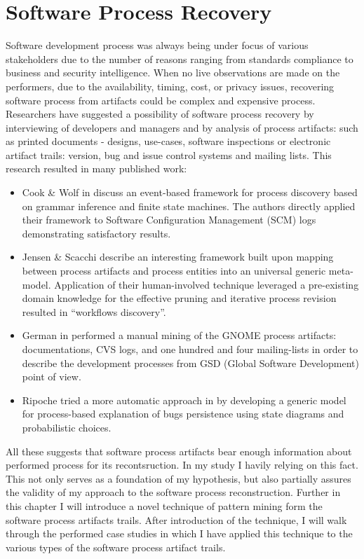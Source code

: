 \chapter{Software Process Recovery}
Software development process was always being under focus of various stakeholders due to the number of reasons ranging from standards compliance to business and security intelligence. When no live observations are made on the performers, due to the availability, timing, cost, or privacy issues, recovering software process from artifacts could be complex and expensive process. Researchers have suggested a possibility of software process recovery by interviewing of developers and managers and by analysis of process artifacts: such as printed documents - designs, use-cases, software inspections or electronic artifact trails: version, bug and issue control systems and mailing lists. This research resulted in many published work: 
\begin{itemize}
\item{Cook \& Wolf in \cite{citeulike:328044} discuss an event-based framework for process discovery based on grammar inference and finite state machines. The authors directly applied their framework to Software Configuration Management (SCM) logs demonstrating satisfactory results.}
\item{Jensen \& Scacchi \cite{citeulike:5043664} describe an interesting framework built upon mapping between process artifacts and process entities into an universal generic meta-model. Application of their human-involved technique leveraged a pre-existing domain knowledge for the effective pruning and iterative process revision resulted in ``workflows discovery''.}
\item{German in \cite{citeulike:421438} performed a manual mining of the GNOME process artifacts: documentations, CVS logs, and one hundred and four mailing-lists in order to describe the development processes from GSD (Global Software Development) point of view.
}
\item{Ripoche tried a more automatic approach in \cite{citeulike:9112798} by developing a generic model for process-based explanation of bugs persistence using state diagrams and probabilistic choices.}
\end{itemize}
All these suggests that software process artifacts bear enough information about performed process for its recontsruction. In my study I havily relying on this fact. This not only serves as a foundation of my hypothesis, but also partially assures the validity of my approach to the software process reconstruction. Further in this chapter I will introduce a novel technique of pattern mining form the software process artifacts trails. After introduction of the technique, I will walk through the performed case studies in which I have applied this technique to the various types of the software process artifact trails. 

